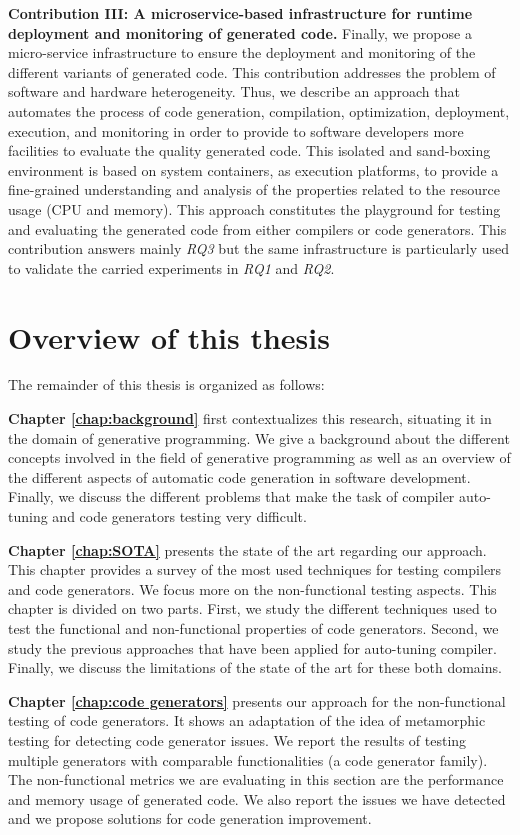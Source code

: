 \textbf{Contribution III: A microservice-based infrastructure for runtime deployment and monitoring of generated code.}
Finally, we propose a micro-service infrastructure to ensure the deployment and monitoring of the different variants of generated code. This contribution addresses the problem of software and hardware heterogeneity. Thus, we describe an approach that automates the process of code generation, compilation, optimization, deployment, execution, and monitoring in order to provide to software developers more facilities to evaluate the quality generated code. 
This isolated and sand-boxing environment is based on system containers, as execution platforms, to provide a fine-grained understanding and analysis of the properties related to the resource usage (CPU and memory). 
This approach constitutes the playground for testing and evaluating the generated code from either compilers or code generators. This contribution answers mainly \textit{RQ3} but the same infrastructure is particularly used to validate the carried experiments in \textit{RQ1} and \textit{RQ2}.

\section{Overview of this thesis}
The remainder of this thesis is organized  as follows:

\textbf{Chapter \ref{chap:background}} first contextualizes this research, situating it in the domain of generative programming. We give a background about the different concepts involved in the field of generative programming as well as an overview of the different aspects of automatic code generation in software development. Finally, we discuss the different problems that make the task of compiler auto-tuning and code generators testing very difficult.

\textbf{Chapter \ref{chap:SOTA}} presents the state of the art regarding our approach. This chapter provides a survey of the most used techniques for testing compilers and code generators. We focus more on the non-functional testing aspects.
This chapter is divided on two parts. First, we study the different techniques used to test the functional and non-functional properties of code generators. Second, we study the previous approaches that have been applied for auto-tuning compiler. Finally, we discuss the limitations of the state of the art for these both domains.

\textbf{Chapter \ref{chap:code generators}} presents our approach for the non-functional testing of code generators. It shows an adaptation of the idea of metamorphic testing for detecting code generator issues. We report the results of testing multiple generators with comparable functionalities (a code generator family). The non-functional metrics we are evaluating in this section are the performance and memory usage of generated code. We also report the issues we have detected and we propose solutions for code generation improvement.

